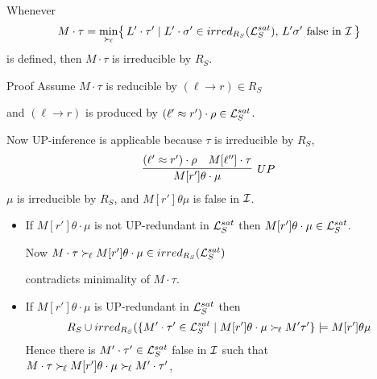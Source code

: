 \documentclass[%
handout,
]{beamer}
\begin{document}
\begin{frame}[allowframebreaks]
    \begin{lemma}\label{irreducible}
        Whenever
        \begin{gather*}
            M\cdot\tau = \min_{\mathrel\succ_{\!\ell}}\!
            \left\{\,
            L'\cdot\tau' \mid
            L'\cdot\sigma' \in irred_{R_S}(\mathcal{L}_S^{sat}),\,
            L'\sigma'\text{ false in }\mathcal{I}\,
            \right\}
        \end{gather*}
        is defined, then $M\cdot\tau$ is irreducible by $R_S$.
    \end{lemma}

    \begin{block}{Proof}
        Assume $M\cdot\tau$ is reducible by $(\ell\to r)\in R_S$

        and $(\ell\to r)$ is produced by $(\ell'\approx r')\cdot\rho\in\mathcal{L}_S^{sat}$.

        \vspace{0.7em}
        Now UP-inference is applicable because $\tau$ is irreducible by $R_S$,
        \begin{gather*}
            \infer[UP]
            {M[r']\theta\cdot\mu}
            {(\ell'\mEQ r')\cdot\rho & M[\ell'']\cdot\tau}
        \end{gather*}
        $\mu$ is irreducible by $R_S$, and $M[r']\theta\mu${ is false in }$\mathcal{I}$.
    \end{block}



        \begin{itemize}
            \item If $M[r']\theta\cdot\mu$ is not UP-redundant in $\mathcal{L}_S^{sat}$
            then $M[r']\theta\cdot\mu\in\mathcal{L}_S^{sat}$.

            \vspace{0.7em}
            Now $M\cdot\tau\mathrel\succ_{\!\ell}
            M[r']\theta\cdot\mu\in irred_{R_S}(\mathcal{L}_S^{sat})$

            contradicts minimality of $M\cdot\tau$.


            \vspace{0.7em}
            \item If $M[r']\theta\cdot\mu$ is UP-redundant in $\mathcal{L}_S^{sat}$ then
            \begin{gather*}
                R_S \cup irred_{R_S}(
                \{
                    M'\cdot\tau'\in\mathcal{L}_S^{sat}\mid
                    M[r']\theta\cdot\mu \mathrel\succ_{\!\ell} M'\tau'
                    \} \models M[r']\theta\mu
            \end{gather*}
            Hence there is $M'\cdot\tau'\in\mathcal{L}_S^{sat}$ false in $\mathcal{I}$ such that
            $M\cdot\tau\mathrel\succ_{\!\ell} M[r']\theta\cdot\mu\mathrel\succ_{\!\ell} M'\cdot\tau'$,


\end{itemize}
\end{frame}
\end{document}
